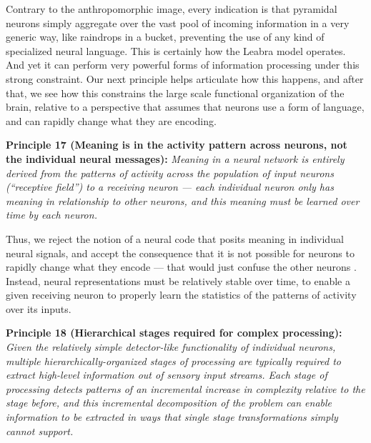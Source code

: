 \documentclass[11pt,twoside]{article}
\begin{document}
Contrary to the anthropomorphic image, every indication is that pyramidal
neurons simply aggregate over the vast pool of incoming information in a very
generic way, like raindrops in a bucket, preventing the use of any kind of
specialized neural language.  This is certainly how the Leabra model operates.
And yet it can perform very powerful forms of information processing under
this strong constraint.  Our next principle helps articulate how this happens,
and after that, we see how this constrains the large scale functional
organization of the brain, relative to a perspective that assumes that neurons
use a form of language, and can rapidly change what they are encoding.

{\bf Principle 17 (Meaning is in the activity pattern across neurons, not the
  individual neural messages):} {\em Meaning in a neural network is entirely
  derived from the patterns of activity across the population of input neurons
  (``receptive field'') to a receiving neuron --- each individual neuron only
  has meaning in relationship to other neurons, and this meaning must be
  learned over time by each neuron.}

Thus, we reject the notion of a neural code that posits meaning in individual
neural signals, and accept the consequence that it is not possible for neurons
to rapidly change what they encode --- that would just confuse the other
neurons \cite{OReilly10}.  Instead, neural representations must be relatively
stable over time, to enable a given receiving neuron to properly learn the
statistics of the patterns of activity over its inputs.

{\bf Principle 18 (Hierarchical stages required for complex processing):} {\em
  Given the relatively simple detector-like functionality of individual
  neurons, multiple hierarchically-organized stages of processing are
  typically required to extract high-level information out of sensory input
  streams.  Each stage of processing detects patterns of an incremental
  increase in complexity relative to the stage before, and this incremental
  decomposition of the problem can enable information to be extracted in ways
  that single stage transformations simply cannot support.}
\end{document}
